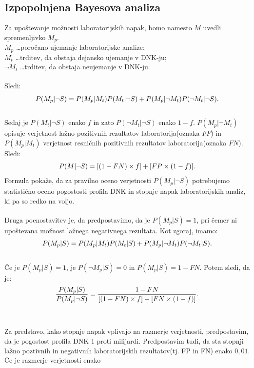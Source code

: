 \documentclass[12pt,a4paper]{amsart}
\theoremstyle{definition} %
\theoremstyle{plain} %
\begin{document}
\subsection{Izpopolnjena Bayesova analiza}
Za upoštevanje možnosti laboratorijskih napak, bomo namesto $M$ uvedli spremenljivko $M_p$.\\
$M_p$ \dots poročano ujemanje laboratorijske analize; \\
$M_t$ \dots trditev, da obstaja dejansko ujemanje v DNK-ju;\\
$\neg M_t$ \dots trditev, da obstaja neujemanje v DNK-ju.\\\\
Sledi:
\[
   P(M_p \lvert \neg S) = P(M_p \lvert M_t)P(M_t \lvert \neg S) + P(M_p \lvert \neg M_t)P(\neg M_t \lvert \neg S). \vspace{2mm}
\]\\
Sedaj je $P(M_t \lvert \neg S)$ enako $f$ in zato $P(\neg M_t \lvert \neg S)$ enako $1-f$. $P(M_p \lvert \neg M_t)$ opisuje verjetnost lažno
pozitivnih rezultatov laboratorija(oznaka $FP$) in $P(M_p \lvert M_t)$ verjetnost resničnih pozitivnih rezultatov laboratorija(oznaka $FN$).
Sledi:
\[
   P(M \lvert \neg S) = [(1 - FN) \times f] + [FP \times (1 - f)]. \vspace{2mm}
\]
Formula pokaže, da za pravilno oceno verjetnosti $P(M_p \lvert \neg S)$ potrebujemo statistično oceno pogostosti profila DNK in stopnje napak
laboratorijskih analiz, ki pa so redko na voljo.\\\\
Druga poenostavitev je, da predpostavimo, da je $P(M_p \lvert S) = 1$, pri čemer ni upoštevana možnost lažnega negativnega rezultata. Kot zgoraj,
imamo:
\[
   P(M_p \lvert S) = P(M_p \lvert M_t)P(M_t \lvert S) + P(M_p \lvert \neg M_t)P(\neg M_t \lvert S). \vspace{2mm}
\]\\
Če je $P(M_p \lvert S) = 1$, je $P(\neg M_p \lvert S) = 0$ in $P(M_p \lvert S) = 1 - FN$. Potem sledi, da je:
\[
   \frac{P(M_p \lvert S)}{P(M_p \lvert \neg S)} = \frac{1 - FN}{[(1 - FN) \times f] + [FN \times (1 - f)]}. \vspace{2mm}
\]\\\\
Za predstavo, kako stopnje napak vplivajo na razmerje verjetnosti, predpostavim, da je pogostost profila DNK 1 proti milijardi. Predpostavim
tudi, da sta stopnji lažno poztivnih in negativnih laboratorijskih rezultatov(tj. FP in FN) enako $0,01$. Če je razmerje verjetnosti enako
\end{document}
